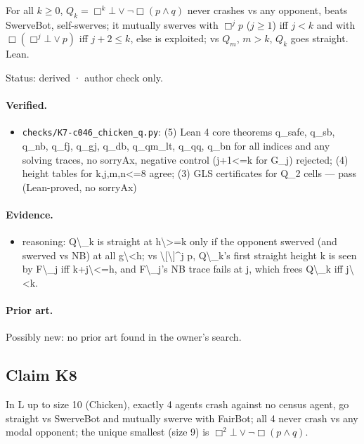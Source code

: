 \documentclass{article}
\begin{document}
For all $k\ge0$, $Q_k=\Box^k\bot\vee\neg\Box(p\wedge q)$ never crashes vs any opponent, beats SwerveBot, self-swerves; it mutually swerves with $\Box^jp$ ($j\ge1$) iff $j<k$ and with $\Box(\Box^j\bot\vee p)$ iff $j+2\le k$, else is exploited; vs $Q_m$, $m>k$, $Q_k$ goes straight. Lean.

Status: derived · author check only.

\paragraph{Verified.}
\begin{itemize}
\item \texttt{checks/K7-c046\_chicken\_q.py}: (5) Lean 4 core theorems q\_safe, q\_sb, q\_nb, q\_fj, q\_gj, q\_db, q\_qm\_lt, q\_qq, q\_bn for all indices and any solving traces, no sorryAx, negative control (j+1\textless{}=k for G\_j) rejected; (4) height tables for k,j,m,n\textless{}=8 agree; (3) GLS certificates for Q\_2 cells --- pass (Lean-proved, no sorryAx)
\end{itemize}

\paragraph{Evidence.}
\begin{itemize}
\item reasoning: Q\textbackslash{}\_k is straight at h\textbackslash{}\textgreater{}=k only if the opponent swerved (and swerved vs NB) at all g\textbackslash{}\textless{}h; vs \textbackslash{}[\textbackslash{}]\textasciicircum{}j p, Q\textbackslash{}\_k's first straight height k is seen by F\textbackslash{}\_j iff k+j\textbackslash{}\textless{}=h, and F\textbackslash{}\_j's NB trace fails at j, which frees Q\textbackslash{}\_k iff j\textbackslash{}\textless{}k.
\end{itemize}

\paragraph{Prior art.} Possibly new: no prior art found in the owner's search.

\subsection*{Claim K8}

In L up to size 10 (Chicken), exactly 4 agents crash against no census agent, go straight vs SwerveBot and mutually swerve with FairBot; all 4 never crash vs any modal opponent; the unique smallest (size 9) is $\Box^2\bot\vee\neg\Box(p\wedge q)$.
\end{document}
